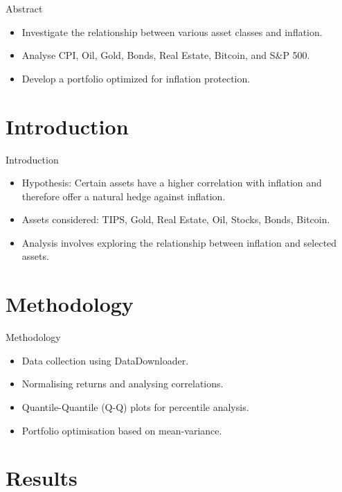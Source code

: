 \documentclass{beamer}
\begin{document}
\begin{frame}{Abstract}
  \begin{itemize}
    \item Investigate the relationship between various asset classes and inflation.
    \item Analyse CPI, Oil, Gold, Bonds, Real Estate, Bitcoin, and S\&P 500.
    \item Develop a portfolio optimized for inflation protection.
  \end{itemize}
\end{frame}

\section{Introduction}

\begin{frame}{Introduction}
  \begin{itemize}
    \item Hypothesis: Certain assets have a higher correlation with inflation and therefore offer a natural hedge against inflation.
    \item Assets considered: TIPS, Gold, Real Estate, Oil, Stocks, Bonds, Bitcoin.
    \item Analysis involves exploring the relationship between inflation and selected assets.
  \end{itemize}
\end{frame}

\section{Methodology}

\begin{frame}{Methodology}
  \begin{itemize}
    \item Data collection using DataDownloader.
    \item Normalising returns and analysing correlations.
    \item Quantile-Quantile (Q-Q) plots for percentile analysis.
    \item Portfolio optimisation based on mean-variance.
  \end{itemize}
\end{frame}

\section{Results}
\end{document}
